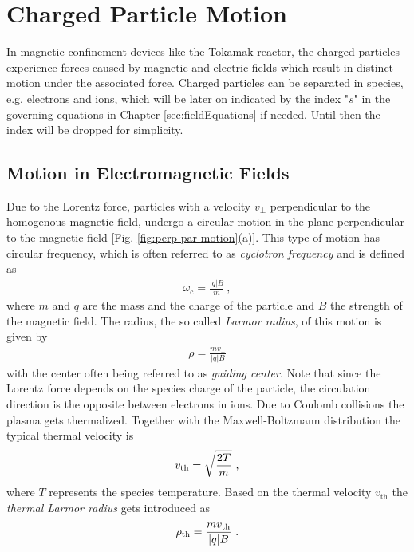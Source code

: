 \section{Charged Particle Motion}
\label{sec:motion}

In magnetic confinement devices like the Tokamak reactor, the charged particles experience forces caused by magnetic and electric fields which result in distinct motion under the associated force. Charged particles can be separated in species, e.g. electrons and ions, which will be later on indicated by the index "$s$" in the governing equations in Chapter \ref{sec:fieldEquations} if needed. Until then the index will be dropped for simplicity.

\subsection{Motion in Electromagnetic Fields}
\label{sub:motion}

Due to the Lorentz force, particles with a velocity $v_{\perp}$ perpendicular to the homogenous magnetic field, undergo a circular motion in the plane perpendicular to the magnetic field [Fig. \ref{fig:perp-par-motion}(a)]. This type of motion has circular frequency, which is often referred to as \textit{cyclotron frequency} and is defined as
\begin{gather}
    \omega_\mathrm{c} = \frac{|q|B}{m}~,
    \label{eq:cyclotron}
\end{gather}
where $m$ and $q$ are the mass and the charge of the particle and $B$ the strength of the magnetic field. The radius, the so called \textit{Larmor radius}, of this motion is given by
\begin{gather}
    \rho = \frac{mv_{\perp}}{|q|B}
    \label{eq:Larmorradius}
\end{gather}
with the center often being referred to as \textit{guiding center}. Note that since the Lorentz force depends on the species charge of the particle, the circulation direction is the opposite between electrons in ions. Due to Coulomb collisions the plasma gets thermalized. Together with the Maxwell-Boltzmann distribution the typical thermal velocity is
\begin{gather}
    v_\mathrm{th} = \sqrt{\frac{2T}{m}}~,
    \label{eq:thermalVelocity}
\end{gather}
where $T$ represents the species temperature. Based on the thermal velocity $v_\mathrm{th}$ the \textit{thermal Larmor radius} gets introduced as
\begin{gather}
    \rho_{\mathrm{th}} = \frac{mv_\mathrm{th}}{|q|B}~.
    \label{eq:thermalLarmorradius}
\end{gather}

